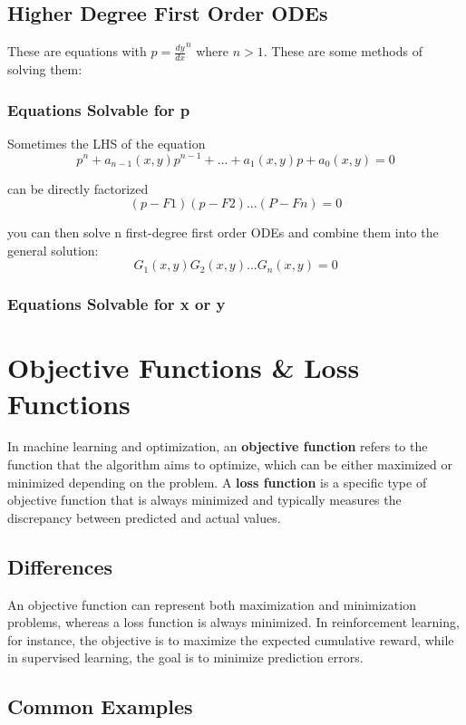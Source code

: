 \documentclass[12pt]{article}
\begin{document}
\subsection{Higher Degree First Order ODEs}
These are equations with \(p=\frac{dy}{dx}^n\) where \(n>1\). These are some methods of solving them:
\subsubsection{Equations Solvable for p}
Sometimes the LHS of the equation 
\[p^n + a_{n-1}(x,y)p^{n-1} + ... + a_1(x,y)p + a_0(x,y) = 0\]

can be directly factorized
\[(p - F1)(p - F2)...(P-Fn) = 0\]

you can then solve n first-degree first order ODEs and combine them into the general solution:
\[G_1(x,y)G_2(x,y)...G_n(x,y) = 0\]

\subsubsection{Equations Solvable for x or y}
\section{Objective Functions \& Loss Functions}

In machine learning and optimization, an \textbf{objective function} refers to the function that the algorithm aims to optimize, which can be either maximized or minimized depending on the problem. A \textbf{loss function} is a specific type of objective function that is always minimized and typically measures the discrepancy between predicted and actual values.

\subsection{Differences}
An objective function can represent both maximization and minimization problems, whereas a loss function is always minimized. In reinforcement learning, for instance, the objective is to maximize the expected cumulative reward, while in supervised learning, the goal is to minimize prediction errors.

\subsection{Common Examples}
\end{document}
